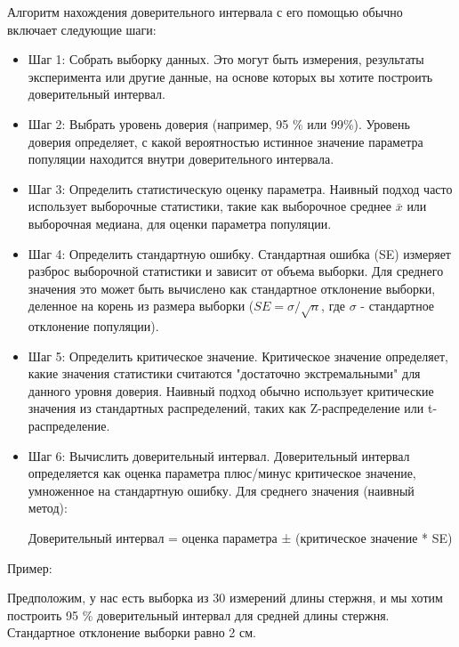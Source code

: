 \documentclass[specialist,
               substylefile = spbu_report.rtx,
               subf,href,colorlinks=true, 12pt]{disser}
\begin{document}
Алгоритм нахождения доверительного интервала с его помощью обычно включает следующие шаги:
\begin{itemize}
    \item Шаг 1: Собрать выборку данных. Это могут быть измерения, результаты эксперимента или другие данные, на основе которых вы хотите построить доверительный интервал.
    \item Шаг 2: Выбрать уровень доверия (например, 95 \% или 99\%). Уровень доверия определяет, с какой вероятностью истинное значение параметра популяции находится внутри доверительного интервала.
    \item Шаг 3: Определить статистическую оценку параметра. Наивный подход часто использует выборочные статистики, такие как выборочное среднее $\bar{x}$ или выборочная медиана, для оценки параметра популяции.
    \item Шаг 4: Определить стандартную ошибку. Стандартная ошибка (SE) измеряет разброс выборочной статистики и зависит от объема выборки. Для среднего значения это может быть вычислено как стандартное отклонение выборки, деленное на корень из размера выборки ($SE = \sigma / \sqrt{n} $, где $\sigma$ - стандартное отклонение популяции).
    \item Шаг 5: Определить критическое значение. Критическое значение определяет, какие значения статистики считаются "достаточно экстремальными" для данного уровня доверия. Наивный подход обычно использует критические значения из стандартных распределений, таких как Z-распределение или t-распределение.
    \item Шаг 6: Вычислить доверительный интервал. Доверительный интервал определяется как оценка параметра плюс/минус критическое значение, умноженное на стандартную ошибку. Для среднего значения (наивный метод):
    
    Доверительный интервал = оценка параметра ± (критическое значение * SE)

\end{itemize}

Пример:

Предположим, у нас есть выборка из 30 измерений длины стержня, и мы хотим построить 95 \% доверительный интервал для средней длины стержня. Стандартное отклонение выборки равно 2 см.
\end{document}
